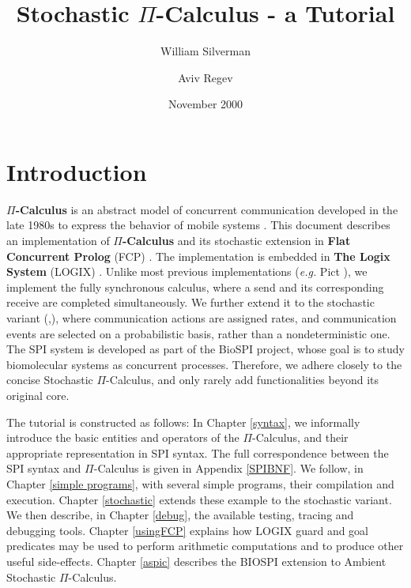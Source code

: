 \title{Stochastic $\Pi$-Calculus - a Tutorial}
\author{William Silverman \and Aviv Regev}
\date{November 2000}
 
\maketitle

\tableofcontents

\chapter{Introduction}
{\bf $\Pi$-Calculus} is an abstract model of concurrent communication
developed in the late 1980s to express the behavior of mobile systems
\cite{Milner99}.  This document describes an implementation of
{\bf $\Pi$-Calculus} and its stochastic extension in {\bf Flat
Concurrent Prolog} (FCP) \cite{Shapiro87a}.  The implementation is
embedded in {\bf The Logix System} (LOGIX)
\cite{logix:user-man,logix:user-man-supp}. Unlike most previous
implementations ({\em e.g.} Pict \cite{PT99}), we implement the fully
synchronous calculus, where a send and its corresponding receive
are completed simultaneously.  We further extend it to the stochastic
variant (\cite{Pri95},\cite{RPSS}), where communication actions are
assigned rates, and communication events are selected on a
probabilistic basis, rather than a nondeterministic one.  The SPI
system is developed as part of the BioSPI project, whose goal is to
study biomolecular systems as concurrent processes. Therefore, we
adhere closely to the concise Stochastic $\Pi$-Calculus, and only rarely
add functionalities beyond its original core.

The tutorial is constructed as follows: In Chapter \ref{syntax}, we
informally introduce the basic entities and operators of the
$\Pi$-Calculus, and their appropriate representation in SPI syntax. The
full correspondence between the SPI syntax and $\Pi$-Calculus is given in
Appendix \ref{SPIBNF}.  We follow, in Chapter \ref{simple programs}, with
several simple programs, their compilation and execution. Chapter
\ref{stochastic} extends these example to the stochastic variant.  We
then describe, in Chapter \ref{debug}, the available testing,
tracing and debugging tools. Chapter \ref{usingFCP} explains how
LOGIX guard and goal predicates may be used to perform arithmetic
computations and to produce other useful side-effects.  Chapter
\ref{aspic} describes the BIOSPI extension to Ambient Stochastic
$\Pi$-Calculus.

